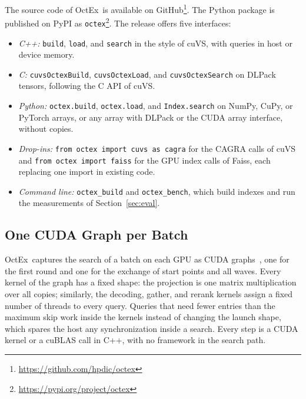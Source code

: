 \documentclass[letterpaper,twocolumn,10pt]{article}
\newcommand{\sysname}{OctEx}
\begin{document}
The source code of \sysname\ is available on GitHub\footnote{\url{https://github.com/hpdic/octex}}. The Python package is published on PyPI as \texttt{octex}\footnote{\url{https://pypi.org/project/octex}}. The release offers five interfaces:
{\raggedright
\begin{itemize}
  \item \emph{C++:} \texttt{build}, \texttt{load}, and \texttt{search} in the style of cuVS, with queries in host or device memory.
  \item \emph{C:} \texttt{cuvsOctexBuild}, \texttt{cuvsOctexLoad}, and \texttt{cuvsOctexSearch} on DLPack tensors, following the C API of cuVS.
  \item \emph{Python:} \texttt{octex.build}, \texttt{octex.load}, and \texttt{Index.search} on NumPy, CuPy, or PyTorch arrays, or any array with DLPack or the CUDA array interface, without copies.
  \item \emph{Drop-ins:} \texttt{from octex import cuvs as cagra} for the CAGRA calls of cuVS and \texttt{from octex import faiss} for the GPU index calls of Faiss, each replacing one import in existing code.
  \item \emph{Command line:} \texttt{octex\_build} and \texttt{octex\_bench}, which build indexes and run the measurements of Section~\ref{sec:eval}.
\end{itemize}
\par}

\subsection{One CUDA Graph per Batch}
\label{sec:graph}

\sysname\ captures the search of a batch on each GPU as CUDA graphs~\cite{nvidia2025cudagraphs}, one for the first round and one for the exchange of start points and all waves. Every kernel of the graph has a fixed shape: the projection is one matrix multiplication over all copies; similarly, the decoding, gather, and rerank kernels assign a fixed number of threads to every query. Queries that need fewer entries than the maximum skip work inside the kernels instead of changing the launch shape, which spares the host any synchronization inside a search. Every step is a CUDA kernel or a cuBLAS call in C++, with no framework in the search path.
\end{document}
